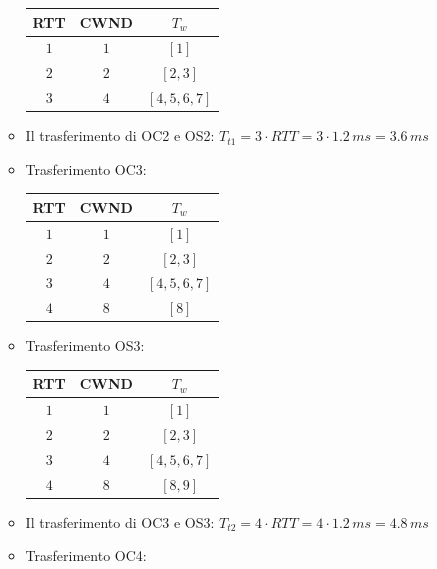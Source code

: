 \documentclass[10pt]{article}
\newcommand{\lightrule}{%
	\arrayrulecolor{black!30}%
	\midrule[\lightrulewidth]%
	\arrayrulecolor{black}}
\begin{document}
\begin{enumerate}
\begin{itemize}
			\begin{center}
				\centering
 				\begin{tabular}{@{} *{3}{c} @{}}
 				\toprule
 					\textbf{RTT} & \textbf{CWND} & \textbf{$T_w$} \\
 				\midrule
 					$1$ & $1$ & $[1]$ \\ 
				\lightrule
 					$2$ & $2$ & $[2,3]$ \\
 				\lightrule
 					$3$ & $4$ & $[4,5,6,7]$ \\
				\bottomrule
				\end{tabular}
			\end{center}
			\smallskip
			\item Il trasferimento di OC2 e OS2: $T_{t1} = 3 \cdot RTT = 3 \cdot 1.2 \,ms = 3.6 \,ms$
			\item Trasferimento OC3:
			\begin{center}
				\centering
 				\begin{tabular}{@{} *{3}{c} @{}}
 				\toprule
 					\textbf{RTT} & \textbf{CWND} & \textbf{$T_w$} \\
 				\midrule
 					$1$ & $1$ & $[1]$ \\ 
				\lightrule
 					$2$ & $2$ & $[2,3]$ \\ 
 				\lightrule
 					$3$ & $4$ & $[4,5,6,7]$ \\ 
 				\lightrule
 					$4$ & $8$ & $[8]$ \\
				\bottomrule
				\end{tabular}
			\end{center}
			\item Trasferimento OS3:
			\begin{center}
				\centering
 				\begin{tabular}{@{} *{3}{c} @{}}
 				\toprule
 					\textbf{RTT} & \textbf{CWND} & \textbf{$T_w$} \\
 				\midrule
 					$1$ & $1$ & $[1]$ \\ 
				\lightrule
 					$2$ & $2$ & $[2,3]$ \\
				\lightrule
 					$3$ & $4$ & $[4,5,6,7]$ \\ 				
 				\lightrule
 					$4$ & $8$ & $[8,9]$ \\
				\bottomrule
				\end{tabular}
			\end{center}
			\item Il trasferimento di OC3 e OS3: $T_{t2} = 4 \cdot RTT = 4 \cdot 1.2 \,ms = 4.8 \,ms$
			\item Trasferimento OC4:
			\begin{center}

\end{center}
\end{itemize}
\end{enumerate}
\end{document}
